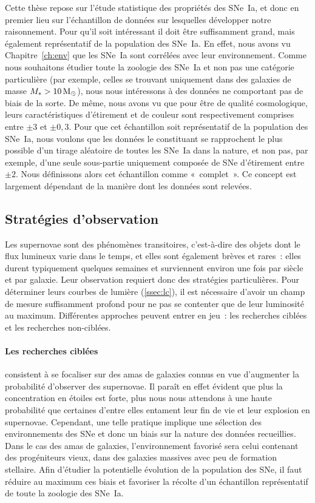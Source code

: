 \documentclass[../main/main.tex]{subfiles}
\begin{document}
Cette thèse repose sur l'étude statistique des propriétés des SNe~Ia, et donc en
premier lieu sur l'échantillon de données sur lesquelles développer notre
raisonnement. Pour qu'il soit intéressant il doit être suffisamment grand, mais
également représentatif de la population des SNe~Ia. En effet, nous avons vu
Chapitre~\ref{ch:env} que les SNe~Ia sont corrélées avec leur environnement.
Comme nous souhaitons étudier toute la zoologie des SNe~Ia et non pas une
catégorie particulière (par exemple, celles se trouvant uniquement dans des
galaxies de masse $M_* > \SI{10}{M\ensuremath{_{\odot}}}$), nous nous intéressons à des données
ne comportant pas de biais de la sorte. De même, nous avons vu que pour être de
qualité cosmologique, leurs caractéristiques d'étirement et de couleur sont
respectivement comprises entre $\pm3$ et $\pm0,3$. Pour que cet échantillon soit
représentatif de la population des SNe~Ia, nous voulons que les données le
constituant se rapprochent le plus possible d'un tirage aléatoire de toutes les
SNe~Ia dans la nature, et non pas, par exemple, d'une seule sous-partie
uniquement composée de SNe d'étirement entre $\pm2$. Nous définissons alors cet
échantillon comme «~complet~». Ce concept est largement dépendant de la manière
dont les données sont relevées.

\subsection{Stratégies d'observation}\label{ssec:startobs}

Les supernovae sont des phénomènes transitoires, c'est-à-dire des objets dont le
flux lumineux varie dans le temps, et elles sont également brèves et rares~:
elles durent typiquement quelques semaines et surviennent environ une fois par
siècle et par galaxie. Leur observation requiert donc des stratégies
particulières. Pour déterminer leurs courbes de lumière (\ref{ssec:lc}), il est
nécessaire d'avoir un champ de mesure suffisamment profond pour ne pas se
contenter que de leur luminosité au maximum. Différentes approches peuvent
entrer en jeu~: les recherches ciblées et les recherches non-ciblées.

\paragraph*{Les recherches ciblées} consistent à se focaliser sur des amas de
galaxies connus en vue d'augmenter la probabilité d'observer des supernovae. Il
paraît en effet évident que plus la concentration en étoiles est forte, plus
nous nous attendons à une haute probabilité que certaines d'entre elles
entament leur fin de vie et leur explosion en supernovae. Cependant, une telle
pratique implique une sélection des environnements des SNe et donc un biais sur
la nature des données recueillies. Dans le cas des amas de galaxies,
l'environnement favorisé sera celui contenant des progéniteurs vieux, dans des
galaxies massives avec peu de formation stellaire. Afin d'étudier la potentielle
évolution de la population des SNe, il faut réduire au maximum ces biais et
favoriser la récolte d'un échantillon représentatif de toute la zoologie des
SNe~Ia.
\end{document}

